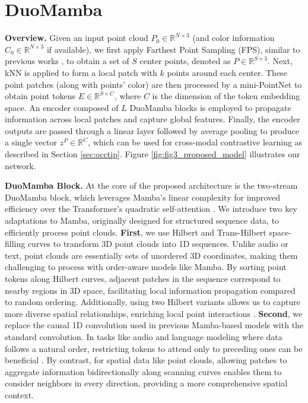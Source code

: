 \section{DuoMamba}
\label{sec:duomamba}
\vspace{1mm} \noindent\textbf{Overview.} Given an input point cloud $P_0 \in \mathbb{R}^{N \times 3}$ (and color information $C_0 \in \mathbb{R}^{N \times 3}$ if available), we first apply Farthest Point Sampling (FPS), similar to previous works \cite{sparseconv,pointbert}, to obtain a set of $S$ center points, denoted as $P \in \mathbb{R}^{S \times 3}$. Next, kNN is applied to form a local patch with $k$ points around each center. These point patches (along with points' color) are then processed by a mini-PointNet \cite{pointnet} to obtain point tokens $E \in \mathbb{R}^{S \times C}$, where $C$ is the dimension of the token embedding space. An encoder composed of \( L \) DuoMamba blocks is employed to propagate information across local patches and capture global features. Finally, the encoder outputs are passed through a linear layer followed by average pooling to produce a single vector \( z^P \in \mathbb{R}^C \), which can be used for cross-modal contrastive learning as described in Section \ref{sec:occtip}. Figure \ref{fig:fig3_proposed_model} illustrates our network. 

\vspace{1mm} \noindent\textbf{DuoMamba Block.} At the core of the proposed architecture is the two-stream DuoMamba block, which leverages Mamba’s linear complexity \cite{mamba} for improved efficiency over the Transformer's quadratic self-attention \cite{pointbert,pointmae,point_trans_v1,pointtransformer}. We introduce two key adaptations to Mamba, originally designed for structured sequence data, to efficiently process point clouds.
\textbf{First}, we use Hilbert and Trans-Hilbert \cite{hilbert_curve} space-filling curves to transform 3D point clouds into 1D sequences. Unlike audio or text, point clouds are essentially sets of unordered 3D coordinates, making them challenging to process with order-aware models like Mamba. By sorting point tokens along Hilbert curves, adjacent patches in the sequence correspond to nearby regions in 3D space, facilitating local information propagation compared to random ordering. Additionally, using two Hilbert variants allows us to capture more diverse spatial relationships, enriching local point interactions \cite{point_trans_v3}. 
\textbf{Second}, we replace the causal 1D convolution used in previous Mamba-based models \cite{vmamba,mamba,pointmamba,mamba3d} with the standard convolution. In tasks like audio and language modeling where data follows a natural order, restricting tokens to attend only to preceding ones can be beneficial \cite{causal_1d_wavenet}. By contrast, for spatial data like point clouds, allowing patches to aggregate information bidirectionally along scanning curves enables them to consider neighbors in every direction, providing a more comprehensive spatial context.

